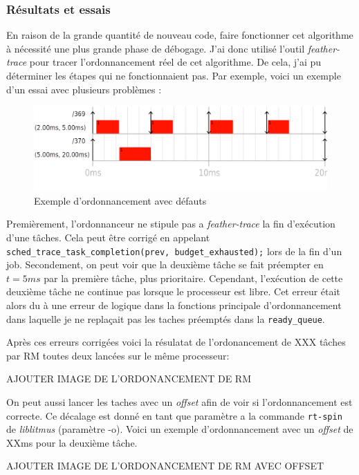 \subsubsection{Résultats et essais}

En raison de la grande quantité de nouveau code, faire fonctionner cet algorithme à nécessité une plus grande phase de débogage. J'ai donc utilisé l'outil \textit{feather-trace} pour tracer l'ordonnancement réel de cet algorithme. De cela, j'ai pu déterminer les étapes qui ne fonctionnaient pas. Par exemple, voici un exemple d'un essai avec plusieurs problèmes : 
\begin{figure}[H]
    \centering
    \includegraphics[width=0.75\paperwidth]{Images/schedule_host=rock960_scheduler=DEMO_trace=notstoped.png}
    \caption{Exemple d'ordonnancement avec défauts}
\end{figure}

Premièrement, l’ordonnanceur ne stipule pas a \textit{feather-trace} la fin d'exécution d'une tâches. Cela peut être corrigé en  appelant \texttt{sched\_trace\_task\_completion(prev, budget\_exhausted);} lors de la fin d'un job.
Secondement, on peut voir que la deuxième tâche se fait préempter en $t=5ms$ par la première tâche, plus prioritaire. Cependant, l'exécution de cette deuxième tâche ne continue pas lorsque le processeur est libre. Cet erreur était alors du à une erreur de logique dans la fonctions principale d’ordonnancement dans laquelle je ne replaçait pas les taches préemptés dans la \texttt{ready\_queue}.

Après ces erreurs corrigées voici la résulatat de l'ordonancement de \color{red}XXX \color{black} tâches par RM toutes deux lancées sur le même processeur:


\begin{center}
    \color{red} AJOUTER IMAGE DE L'ORDONANCEMENT DE RM
\end{center}

On peut aussi lancer les taches avec un \textit{offset} afin de voir si l'ordonnancement est correcte. Ce décalage est donné en tant que paramètre a la commande \texttt{rt-spin} de \textit{liblitmus} (paramètre -o). Voici un exemple d'ordonnancement avec un \textit{offset} de XXms pour la deuxième tâche.
\begin{center}
    \color{red} AJOUTER IMAGE DE L'ORDONANCEMENT DE RM AVEC OFFSET
\end{center}


